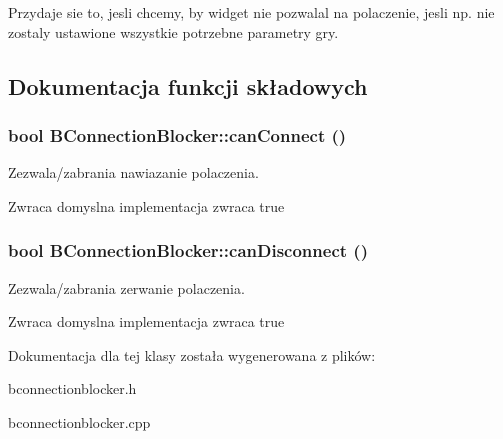 Przydaje sie to, jesli chcemy, by widget nie pozwalal na polaczenie, jesli np. nie zostaly ustawione wszystkie potrzebne parametry gry. 

\subsection{Dokumentacja funkcji składowych}
\hypertarget{class_b_connection_blocker_a2ebcdef0e5570c7331036dd5b6ba4448}{
\subsubsection[{canConnect}]{\setlength{\rightskip}{0pt plus 5cm}bool BConnectionBlocker::canConnect ()}}
\label{class_b_connection_blocker_a2ebcdef0e5570c7331036dd5b6ba4448}


Zezwala/zabrania nawiazanie polaczenia. \begin{DoxyReturn}{Zwraca}
domyslna implementacja zwraca true 
\end{DoxyReturn}
\hypertarget{class_b_connection_blocker_a81e8782c93ac1943a7e19b4ed7ced792}{
\subsubsection[{canDisconnect}]{\setlength{\rightskip}{0pt plus 5cm}bool BConnectionBlocker::canDisconnect ()}}
\label{class_b_connection_blocker_a81e8782c93ac1943a7e19b4ed7ced792}


Zezwala/zabrania zerwanie polaczenia. \begin{DoxyReturn}{Zwraca}
domyslna implementacja zwraca true 
\end{DoxyReturn}


Dokumentacja dla tej klasy została wygenerowana z plików:\begin{DoxyCompactItemize}
\item 
bconnectionblocker.h\item 
bconnectionblocker.cpp\end{DoxyCompactItemize}
